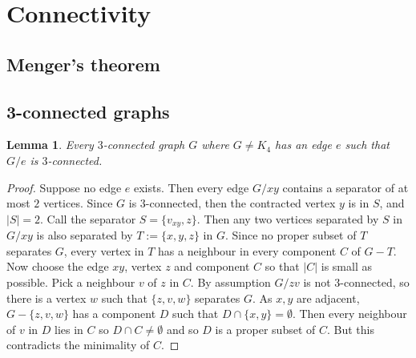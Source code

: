 \documentclass{article}
\author{Eric Luu}
\newtheorem{lemma}[theorem]{Lemma}
\begin{document}
\section{Connectivity}

\subsection{Menger's theorem}

\subsection{3-connected graphs}

\begin{lemma}
    Every $3$-connected graph $G$ where $G \neq K_4$ has an edge $e$ such that $G/e$ is $3$-connected.
\end{lemma}
\begin{proof}
    Suppose no edge $e$ exists. Then every edge $G/xy$ contains a separator of at most $2$ vertices. Since $G$ is $3$-connected, then the contracted vertex $y$ is in $S$, and $|S| = 2$. Call the separator $S = \{v_{xy}, z\}$. Then any two vertices separated by $S$ in $G/xy$ is also separated by $T := \{x,y, z\}$ in $G$. Since no proper subset of $T$ separates $G$, every vertex in $T$ has a neighbour in every component $C$ of $G - T$. Now choose the edge $xy$, vertex $z$ and component $C$ so that $|C|$ is small as possible. Pick a neighbour $v$ of $z$ in $C$. By assumption $G/{zv}$ is not 3-connected, so there is a vertex $w$ such that $\{z,v,w\}$ separates $G$. As $x, y$ are adjacent, $G - \{z,v,w\}$ has a component $D$ such that $D \cap \{x,y\}= \emptyset$. Then every neighbour of $v$ in $D$ lies in $C$ so $D \cap C \neq \emptyset$ and so $D$ is a proper subset of $C$. But this contradicts the minimality of $C$. 
\end{proof}
\end{document}
